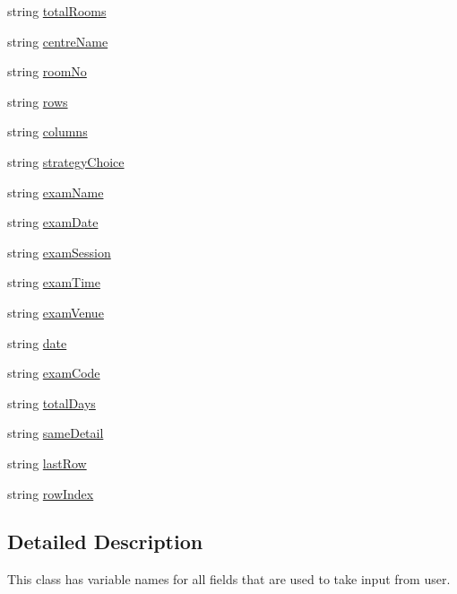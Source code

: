\begin{DoxyCompactItemize}
\item 
string \hyperlink{classInputFieldName_a51fe8230341d7863ffd4672f2c986beb}{total\-Rooms}
\item 
string \hyperlink{classInputFieldName_a19c67f2d38cde97f856d4ca3639f4fc7}{centre\-Name}
\item 
string \hyperlink{classInputFieldName_abb6b245e03e76aa29d7ef8733298e72f}{room\-No}
\item 
string \hyperlink{classInputFieldName_a1b5a819437f52b4bb6b0ea59f542f9a9}{rows}
\item 
string \hyperlink{classInputFieldName_abca049f347e589f24b672c19907c5c72}{columns}
\item 
string \hyperlink{classInputFieldName_a9a6b827d404cb279cc0ed836c069e4a9}{strategy\-Choice}
\item 
string \hyperlink{classInputFieldName_a4cee41667cdc0e38f8f76af94ef39c36}{exam\-Name}
\item 
string \hyperlink{classInputFieldName_a4e60d793497c36b2d80e2411cbb915d8}{exam\-Date}
\item 
string \hyperlink{classInputFieldName_afef45e787d3c737f9bdc3126ce29d8b9}{exam\-Session}
\item 
string \hyperlink{classInputFieldName_ab667062be019e5912683d33c45885bd3}{exam\-Time}
\item 
string \hyperlink{classInputFieldName_affaa2fe8246959748f43ea58f161b2b5}{exam\-Venue}
\item 
string \hyperlink{classInputFieldName_afb053a44abe76e108533e23902e90321}{date}
\item 
string \hyperlink{classInputFieldName_a3cc09a852d20e96bb4908b9f66c01ed7}{exam\-Code}
\item 
string \hyperlink{classInputFieldName_a12ba65660edd7f8f7ecf1e25893716da}{total\-Days}
\item 
string \hyperlink{classInputFieldName_a6de91205e7eac3168e17d100ab4d8e64}{same\-Detail}
\item 
string \hyperlink{classInputFieldName_a12e0f0ec0ad7962271d6dae576e5ee0a}{last\-Row}
\item 
string \hyperlink{classInputFieldName_adfb1d136313267eecabe30391a03b49b}{row\-Index}
\end{DoxyCompactItemize}


\subsection{Detailed Description}
This class has variable names for all fields that are used to take input from user. 

